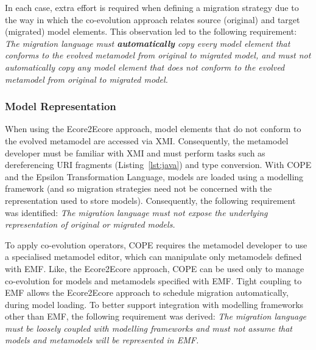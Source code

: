 In each case, extra effort is required when defining a migration strategy due to the way in which the co-evolution approach relates source (original) and target (migrated) model elements. This observation led to the following requirement: \emph{The migration language must \textbf{automatically} copy every model element that conforms to the evolved metamodel from original to migrated model, and must not automatically copy any model element that does not conform to the evolved metamodel from original to migrated model.}


\subsubsection{Model Representation}
When using the Ecore2Ecore approach, model elements that do not conform to the evolved metamodel are accessed via XMI. Consequently, the metamodel developer must be familiar with XMI and must perform tasks such as dereferencing URI fragments (Listing~\ref{lst:java}) and type conversion. With COPE and the Epsilon Transformation Language, models are loaded using a modelling framework (and so migration strategies need not be concerned with the representation used to store models). Consequently, the following requirement was identified: \emph{The migration language must not expose the underlying representation of original or migrated models.}

To apply co-evolution operators, COPE requires the metamodel developer to use a specialised metamodel editor, which can manipulate only metamodels defined with EMF. Like, the Ecore2Ecore approach, COPE can be used only to manage co-evolution for models and metamodels specified with EMF. Tight coupling to EMF allows the Ecore2Ecore approach to schedule migration automatically, during model loading. To better support integration with modelling frameworks other than EMF, the following requirement was derived: \emph{The migration language must be loosely coupled with modelling frameworks and must not assume that models and metamodels will be represented in EMF.}


